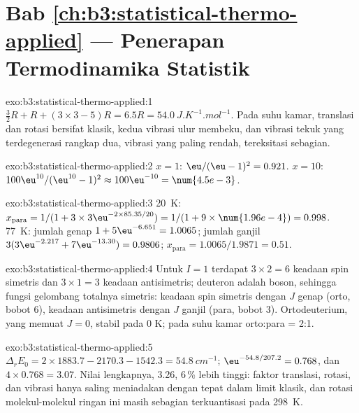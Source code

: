 \section*{Bab \ref{ch:b3:statistical-thermo-applied} --- Penerapan Termodinamika Statistik}

\begin{solution}{exo:b3:statistical-thermo-applied:1}
$\frac32R + R + (3 \times 3 - 5)R = 6.5R = \qty{54.0}{J.K^{-1}.mol^{-1}}$. Pada suhu
kamar, translasi dan rotasi bersifat klasik, kedua vibrasi ulur membeku, dan
vibrasi tekuk yang terdegenerasi rangkap dua, vibrasi yang paling rendah,
tereksitasi sebagian.
\end{solution}

\begin{solution}{exo:b3:statistical-thermo-applied:2}
$x = 1$: $\eu/(\eu - 1)^2 = 0.921$. $x = 10$: $100\eu^{10}/(\eu^{10} - 1)^2 \approx 100\eu^{-10} = \num{4.5e-3}$.
\end{solution}

\begin{solution}{exo:b3:statistical-thermo-applied:3}
\qty{20}{K}: $x_{\mathrm{para}} = 1/(1 + 3 \times 3\eu^{-2 \times 85.35/20}) = 1/(1 + 9 \times \num{1.96e-4}) = 0.998$.
\qty{77}{K}: jumlah genap $1 + 5\eu^{-6.651} = 1.0065$; jumlah ganjil
$3(3\eu^{-2.217} + 7\eu^{-13.30}) = 0.9806$;
$x_{\mathrm{para}} = 1.0065/1.9871 = 0.51$.
\end{solution}

\begin{solution}{exo:b3:statistical-thermo-applied:4}
Untuk $I = 1$ terdapat $3 \times 2 = 6$ keadaan spin simetris dan $3 \times 1 = 3$
keadaan antisimetris; deuteron adalah boson, sehingga fungsi gelombang
totalnya simetris: keadaan spin simetris dengan $J$ genap (orto, bobot 6),
keadaan antisimetris dengan $J$ ganjil (para, bobot 3). Ortodeuterium, yang
memuat $J = 0$, stabil pada 0 K; pada suhu kamar orto:para = 2:1.
\end{solution}

\begin{solution}{exo:b3:statistical-thermo-applied:5}
$\Delta_rE_0 = 2 \times 1883.7 - 2170.3 - 1542.3 = \qty{54.8}{cm^{-1}}$; $\eu^{-54.8/207.2} = 0.768$,
dan $4 \times 0.768 = 3.07$. Nilai lengkapnya, 3.26, 6\,\% lebih tinggi: faktor
translasi, rotasi, dan vibrasi hanya saling meniadakan dengan tepat dalam
limit klasik, dan rotasi molekul-molekul ringan ini masih sebagian
terkuantisasi pada \qty{298}{K}.
\end{solution}

